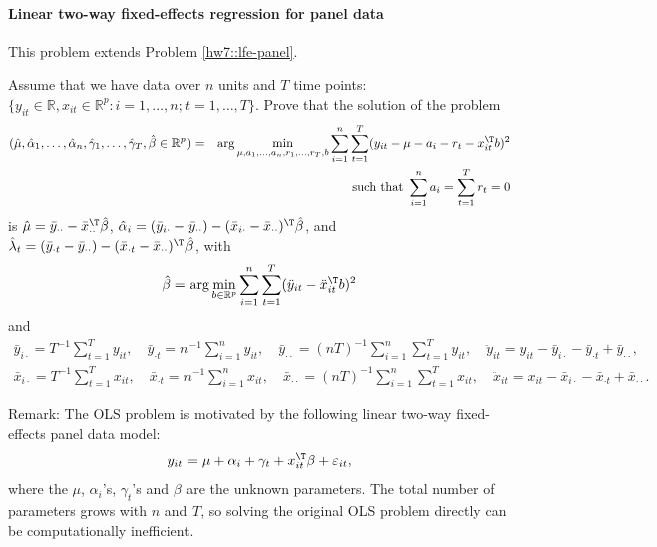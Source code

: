 \paragraph{Linear two-way fixed-effects regression for panel data}
\label{hw7::lfe-panel-TWFE}

This problem extends Problem \ref{hw7::lfe-panel}. 


Assume that we have data over $n$ units and $T$ time points: $\{ y_{it} \in \mathbb{R}, x_{it} \in \mathbb{R}^p : i=1, \ldots, n; t = 1, \ldots, T \}$. Prove that the solution of the problem
\begin{eqnarray*}
(\hat{\mu}, \hat{\alpha}_1, \ldots, \hat{\alpha}_n, \hat{\gamma}_1, \ldots, \hat{\gamma}_T,  \hat{\beta} \in \mathbb{R}^p)
&=& \arg\min_{\mu, a_1, \ldots, a_n, r_1, \ldots, r_T,  b} \sum_{i=1}^n \sum_{t=1}^T
( y_{it} - \mu -  a_i - r_t  - x_{it}^{\T} b )^2 \\
&&\text{such that } \sum_{i=1}^n a_i = \sum_{t=1}^T r_t = 0
\end{eqnarray*}
is 
$\hat{\mu} = \bar{y}_{\cdot\cdot} -\bar{x}_{\cdot\cdot}^{\T} \hat{\beta} $, 
$\hat{\alpha}_i = (\bar{y}_{i\cdot} - \bar{y}_{\cdot\cdot}) - (  \bar{x}_{i\cdot}  - \bar{x}_{\cdot \cdot} )^{\T} \hat{\beta}$, 
and $\hat{\lambda}_t = (\bar{y}_{\cdot t} - \bar{y}_{\cdot\cdot}) - (  \bar{x}_{\cdot t}  - \bar{x}_{\cdot \cdot} )^{\T} \hat{\beta}$, with 
$$
\hat{\beta} = \arg\min_{  b \in \mathbb{R}^p } \sum_{i=1}^n \sum_{t=1}^T
( \ddot{y}_{it} -  \ddot{x}_{it}^{\T} b )^2
$$
and 
\begin{eqnarray*}
\bar{y}_{i\cdot}  = T^{-1} \sum_{t=1}^T y_{it}, \quad
\bar{y}_{\cdot t}  = n^{-1} \sum_{i=1}^n y_{it}, \quad
\bar{y}_{\cdot\cdot} = (nT)^{-1} \sum_{i=1}^n\sum_{t=1}^T y_{it},\quad 
\ddot{y}_{it} = y_{it} - \bar{y}_{i\cdot}  - \bar{y}_{\cdot t}  + \bar{y}_{\cdot\cdot}, \\ 
\bar{x}_{i\cdot}  = T^{-1} \sum_{t=1}^T x_{it}, \quad
\bar{x}_{\cdot t}  = n^{-1} \sum_{i=1}^n x_{it}, \quad
\bar{x}_{\cdot\cdot} = (nT)^{-1} \sum_{i=1}^n\sum_{t=1}^T x_{it},\quad 
\ddot{x}_{it} = x_{it} - \bar{x}_{i\cdot}  - \bar{x}_{\cdot t}  + \bar{x}_{\cdot\cdot} . 
\end{eqnarray*}




Remark: The OLS problem is motivated by the following linear two-way fixed-effects  panel data model:
$$
y_{it} = \mu +  \alpha_i + \gamma_t +  x_{it}^{\T} \beta + \varepsilon_{it},
$$
where the $\mu$, $\alpha_i$'s, $\gamma_t$'s and $\beta$ are the unknown parameters. The total number of parameters grows with $n$ and $T$, so solving the original OLS problem directly can be computationally inefficient. 


